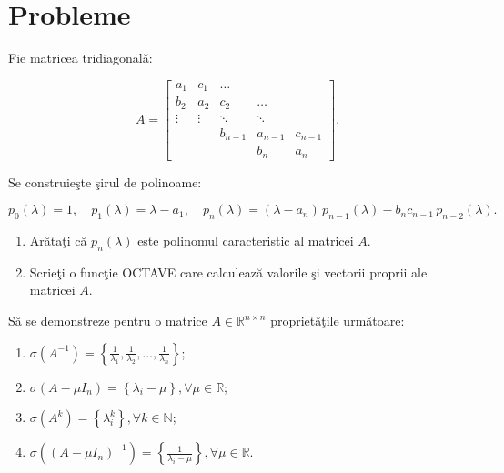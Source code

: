 \documentclass{exam}
\begin{document}

\section{Probleme}

\begin{questions}

	\question Fie matricea tridiagonală:

	\[
		A = \begin{bmatrix}
			a_1    & c_1    & \dots   &         &         \\
			b_2    & a_2    & c_2     & \dots   &         \\
			\vdots & \vdots & \ddots  & \ddots  &         \\
			       &        & b_{n-1} & a_{n-1} & c_{n-1} \\
			       &        &         & b_n     & a_n
		\end{bmatrix}.
	\]

	Se construieşte şirul de polinoame:

	\[
		p_0(\lambda) = 1,\quad
		p_1(\lambda) = \lambda - a_1,\quad
		p_n(\lambda) = (\lambda - a_n)\,p_{n-1}(\lambda) - b_n c_{n-1}\,p_{n-2}(\lambda).
	\]

	\begin{enumerate}
		\item Arătaţi că $p_{n}(\lambda)$ este polinomul caracteristic al matricei $A$.
		\item Scrieţi o funcţie OCTAVE care calculează valorile şi vectorii proprii ale matricei $A$.
	\end{enumerate}

	\question

	Să se demonstreze pentru o matrice $A \in \mathbb{R}^{n \times n}$ proprietăţile următoare:

	\begin{enumerate}
		\item $\sigma(A^{-1}) = \left\lbrace \tfrac{1}{\lambda _{1}}, \tfrac{1}{\lambda _{2}}, \ldots, \tfrac{1}{\lambda _{n}}\right\rbrace $;
		\item $\sigma(A - \mu I_{n}) = \left\lbrace \lambda_{i} - \mu \right\rbrace , \forall \mu \in \mathbb{R}$;
		\item $\sigma(A^{k}) = \left\lbrace \lambda_{i}^{k} \right\rbrace , \forall k \in \mathbb{N}$;
		\item $\sigma((A - \mu I_{n})^{- 1}) = \left\lbrace \tfrac{1}{\lambda_{i} - \mu} \right\rbrace , \forall \mu \in \mathbb{R}$.
	\end{enumerate}


\end{questions}
\end{document}
